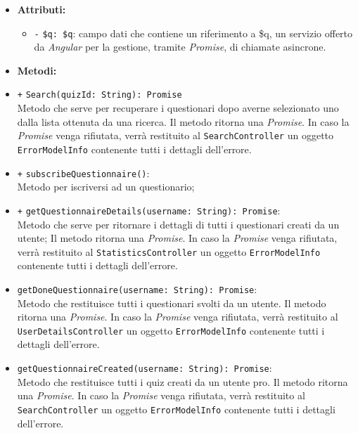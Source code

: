 \begin{itemize}
\begin{itemize}
	\end{itemize}
	\item \textbf{Attributi:}
	\begin{itemize}
		\item \texttt{-} \texttt{\$q: \$q}: campo dati che contiene un riferimento a \$q, un servizio offerto da \textit{Angular} per la gestione, tramite \textit{Promise}, di chiamate asincrone.
	\end{itemize}
	\item \textbf{Metodi:} \\
	\item \texttt{+} \texttt{Search(quizId: String): Promise} \\Metodo che serve per recuperare i questionari dopo averne selezionato uno dalla lista ottenuta da una ricerca. Il metodo ritorna una \textit{Promise}. In caso la \textit{Promise} venga rifiutata, verrà restituito al \texttt{SearchController} un oggetto \texttt{ErrorModelInfo} contenente tutti i dettagli dell'errore. \\
	\item \texttt{+} \texttt{subscribeQuestionnaire()}: \\Metodo per iscriversi ad un questionario;
	\item \texttt{+} \texttt{getQuestionnaireDetails(username: String): Promise}: \\Metodo che serve per ritornare i dettagli di tutti i questionari creati da un utente; Il metodo ritorna una \textit{Promise}. In caso la \textit{Promise} venga rifiutata, verrà restituito al \texttt{StatisticsController} un oggetto \texttt{ErrorModelInfo} contenente tutti i dettagli dell'errore. \\ 
	\item \texttt{getDoneQuestionnaire(username: String): Promise}: \\ Metodo che restituisce tutti i questionari svolti da un utente. Il metodo ritorna una \textit{Promise}. In caso la \textit{Promise} venga rifiutata, verrà restituito al \texttt{UserDetailsController} un oggetto \texttt{ErrorModelInfo} contenente tutti i dettagli dell'errore. \\ 
	\item \texttt{getQuestionnaireCreated(username: String): Promise}: \\Metodo che restituisce tutti i quiz creati da un utente pro. Il metodo ritorna una \textit{Promise}. In caso la \textit{Promise} venga rifiutata, verrà restituito al \texttt{SearchController} un oggetto \texttt{ErrorModelInfo} contenente tutti i dettagli dell'errore. \\

\end{itemize}

